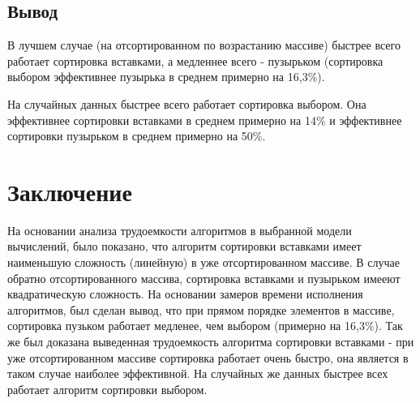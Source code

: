 \documentclass[12pt]{report}
\begin{document}
	\newpage
	
	\section{Вывод}
	
	В лучшем случае (на отсортированном по возрастанию массиве) быстрее всего работает сортировка вставками, а медленнее всего - пузырьком (сортировка выбором эффективнее пузырька в среднем примерно на 16,3\%).
	
	На случайных данных быстрее всего работает сортировка выбором. Она эффективнее сортировки вставками в среднем примерно на 14\% и эффективнее сортировки пузырьком в среднем примерно на 50\%.
	
	
	\chapter*{Заключение}
	
	На основании анализа трудоемкости алгоритмов в выбранной модели вычислений, было показано, что алгоритм сортировки вставками имеет наименьшую сложность (линейную) в уже отсортированном массиве. В случае обратно отсортированного массива, сортировка вставками и пузырьком имееют квадратическую сложность. На основании замеров времени исполнения алгоритмов, был сделан вывод, что при прямом порядке элементов в массиве, сортировка пузьком работает медленее, чем выбором (примерно на 16,3\%). Так же был доказана выведенная трудоемкость алгоритма сортировки вставками - при  уже отсортированном массиве сортировка работает очень быстро, она является в таком случае наиболее эффективной. На случайных же данных быстрее всех работает алгоритм сортировки выбором.
	
	
	
	
\end{document}
